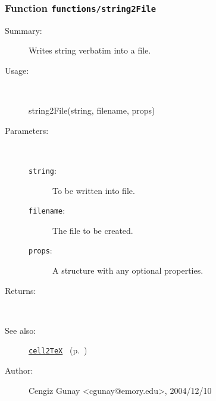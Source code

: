 \subsubsection[Function \texttt{string2File}]{Function \texttt{functions/string2File}}%
%
\label{ref_functions__string2File}%
\hypertarget{ref_functions__string2File}{}%
\begin{description}
\item[Summary:]Writes string verbatim into a file.
%
\item[Usage:]~%
\begin{lyxcode}%
string2File(string, filename, props)
%
\end{lyxcode}%
%
%
\item[Parameters:]~
\begin{description}%
\item[\texttt{string}:]
 To be written into file.
\item[\texttt{filename}:]
 The file to be created.
\item[\texttt{props}:]
 A structure with any optional properties.
\end{description}%
%
\item[Returns:]~

%
%
\item[See also:]%
\hyperlink{ref_cell2TeX}{\texttt{cell2TeX}}%
\ (p.~\pageref{ref_cell2TeX})%
%
%
\item[Author:]%
Cengiz Gunay <cgunay@emory.edu>, 2004/12/10%
\end{description}
\methodline%
